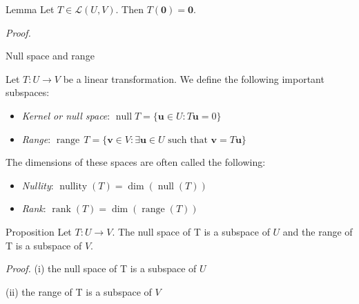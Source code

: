 \documentclass [aspectratio=169]{beamer}
\newcommand{\bu}{{\mathbf{u}}}
\newcommand{\bv}{{\mathbf{v}}}
\newcommand{\zerovec}{{\mathbf{0}}}
\newcommand{\cL}{{\mathcal{L}}}
\DeclareMathOperator{\range}{range}
\DeclareMathOperator{\rank}{rank}
\DeclareMathOperator{\nullspace}{null}
\DeclareMathOperator{\nullity}{nullity}
\begin{document}
\begin{frame}
\begin{alertblock}{Lemma}
Let $T \in \cL(U,V)$. Then $T(\zerovec) = \zerovec$.
\end{alertblock}

\vspace{0.5em}

\textit{Proof.}
\vspace{3cm}

\end{frame}


\begin{frame}{Null space and range}
\begin{definition}
Let $T:U \to V$ be a linear transformation. We define the following important subspaces:
\begin{itemize}
\item \emph{Kernel or null space}: $\nullspace T = \{\bu \in U : T\bu = 0 \}$
\item \emph{Range}: $\range \, T = \{\bv \in V : \exists \bu \in U \text{ such that } \bv = T \bu \}$
\end{itemize}

\vspace{1em}

The dimensions of these spaces are often called the following:
\begin{itemize}
\item \emph{Nullity}: $\nullity(T) = \dim(\nullspace(T))$
\item \emph{Rank}: $\rank(T) = \dim(\range(T))$
\end{itemize}
\end{definition}


\end{frame}



\begin{frame}
\begin{exampleblock}{Proposition}
Let $T: U \to V$. The null space of T is a subspace of $U$ and the range of T is a subspace of $V$.
\end{exampleblock}
\textit{Proof.} (i) the null space of T is a subspace of $U$ 
\vspace{5cm}

\end{frame}

\begin{frame}
(ii) the range of T is a subspace of $V$
\vspace{6cm}
\end{frame}
\end{document}

